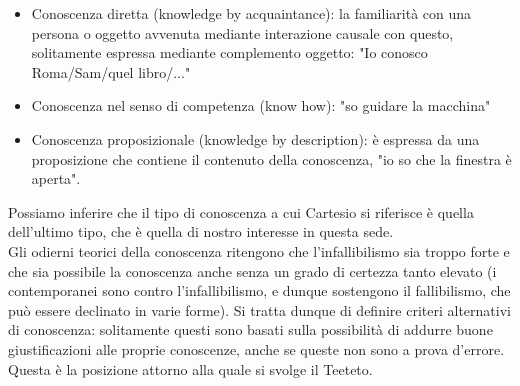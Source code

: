 \documentclass[10pt,a4paper]{article}
\begin{document}
\begin{itemize}
	\item Conoscenza diretta (knowledge by acquaintance): la familiarità con una persona o oggetto avvenuta mediante interazione causale con questo, solitamente espressa mediante complemento oggetto: "Io conosco Roma/Sam/quel libro/..."
	\item Conoscenza nel senso di competenza (know how): "so guidare la macchina"
	\item Conoscenza proposizionale (knowledge by description): è espressa da una proposizione che contiene il contenuto della conoscenza, "io so che la finestra è aperta".
\end{itemize} 
Possiamo inferire che il tipo di conoscenza a cui Cartesio si riferisce è quella dell'ultimo tipo, che è quella di nostro interesse in questa sede.\\
Gli odierni teorici della conoscenza ritengono che l'infallibilismo sia troppo forte e che sia possibile la conoscenza anche senza un grado di certezza tanto elevato (i contemporanei sono contro l'infallibilismo, e dunque sostengono il fallibilismo, che può essere declinato in varie forme). Si tratta dunque di definire criteri alternativi di conoscenza: solitamente questi sono basati sulla possibilità di addurre buone giustificazioni alle proprie conoscenze, anche se queste non sono a prova d'errore. Questa è la posizione attorno alla quale si svolge il Teeteto.
\newpage
\end{document}
